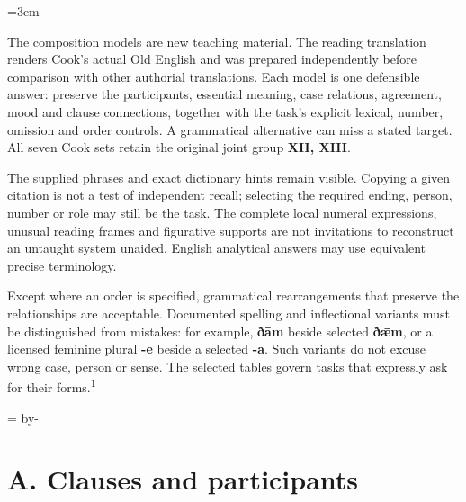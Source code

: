 \BookRecto
\begingroup
\renewcommand{\runningtitle}{Unit 17. Answer key}
\emergencystretch=3em
\newcommand{\itempara}[2]{\par\addvspace{3pt}\noindent\hangindent=1.8em\hangafter=1\makebox[1.8em][l]{#1.}#2\par}
\newcommand{\reserve}[1]{\par\penalty-100\begingroup\dimen0=\pagegoal\advance\dimen0 by-\pagetotal\ifdim\dimen0<#1\newpage\fi\endgroup}

\raggedright
{}

The composition models are new teaching material. The reading translation renders Cook's actual Old English and was prepared independently before comparison with other authorial translations. Each model is one defensible answer: preserve the participants, essential meaning, case relations, agreement, mood and clause connections, together with the task's explicit lexical, number, omission and order controls. A grammatical alternative can miss a stated target. All seven Cook sets retain the original joint group \textbf{XII, XIII}.

The supplied phrases and exact dictionary hints remain visible. Copying a given citation is not a test of independent recall; selecting the required ending, person, number or role may still be the task. The complete local numeral expressions, unusual reading frames and figurative supports are not invitations to reconstruct an untaught system unaided. English analytical answers may use equivalent precise terminology.

Except where an order is specified, grammatical rearrangements that preserve the relationships are acceptable. Documented spelling and inflectional variants must be distinguished from mistakes: for example, \textbf{ðām} beside selected \textbf{ðǣm}, or a licensed feminine plural \textbf{-e} beside a selected \textbf{-a}. Such variants do not excuse wrong case, person or sense. The selected tables govern tasks that expressly ask for their forms.\textsuperscript{1}

\reserve{7\baselineskip}
\section*{A. Clauses and participants}

